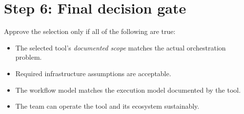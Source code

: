 \documentclass[11pt]{article}
\begin{document}
\section{Step 6: Final decision gate}
Approve the selection only if all of the following are true:
\begin{itemize}
    \item The selected tool's \emph{documented scope} matches the actual orchestration problem.\cite{KubernetesOverview,ArgoCDHome,AnsiblePlaybooks,AirflowHome,TemporalWhatIs,KubeflowIntro}
    \item Required infrastructure assumptions are acceptable.\cite{NomadWhatIs,DockerSwarm,FlyteOSS}
    \item The workflow model matches the execution model documented by the tool.\cite{AirflowArchitecture,TemporalWorkflowExecution,MetaflowWhatIs}
    \item The team can operate the tool and its ecosystem sustainably.
\end{itemize}
\end{document}
